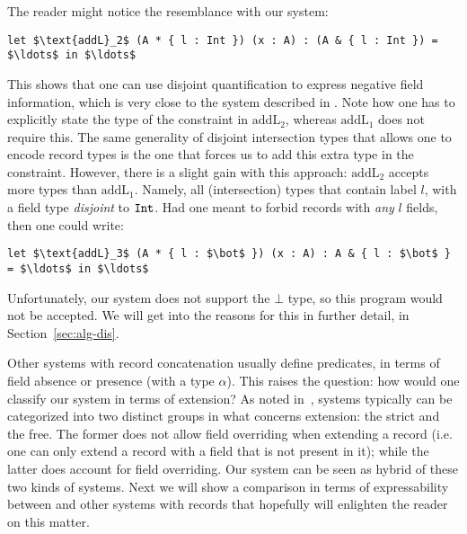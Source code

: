 The reader might notice the resemblance with our system:
\begin{lstlisting}[mathescape=true]
let $\text{addL}_2$ (A * { l : Int }) (x : A) : (A & { l : Int }) = $\ldots$ in $\ldots$ 
\end{lstlisting}

This shows that one can use disjoint quantification to express negative field information, which
is very close to the system described in \cite{harper1991record}.  
Note how one has to explicitly state the type of the constraint in $\text{addL}_2$, whereas 
$\text{addL}_1$ does not require this.
The same generality of disjoint intersection types that allows one to encode record types is the
one that forces us to add this extra type in the constraint.
However, there is a slight gain with this approach: $\text{addL}_2$ accepts more types than
$\text{addL}_1$.
Namely, all (intersection) types that contain label $l$, with a field type \emph{disjoint} to
$\texttt{Int}$.
Had one meant to forbid records with \emph{any} $l$ fields, then one could write:

\begin{lstlisting}[mathescape=true]
let $\text{addL}_3$ (A * { l : $\bot$ }) (x : A) : A & { l : $\bot$ } = $\ldots$ in $\ldots$ 
\end{lstlisting}
Unfortunately, our system does not support the $\bot$ type, so this program would not be accepted.
We will get into the reasons for this in further detail, in Section~\ref{sec:alg-dis}.

Other systems with record concatenation usually define predicates, in terms of field absence or 
presence (with a type $\alpha$). 
This raises the question: how would one classify our system in terms of extension? 
As noted in~\cite{leijen2004extensible}, systems typically can be categorized into two distinct groups
in what concerns extension: the strict and the free.
The former does not allow field overriding when extending a record (i.e. one can only extend a 
record with a field that is not present in it); while the latter does account for field overriding.
Our system can be seen as hybrid of these two kinds of systems.
Next we will show a comparison in terms of expressability between \name and other systems 
with records that hopefully will enlighten the reader on this matter.

